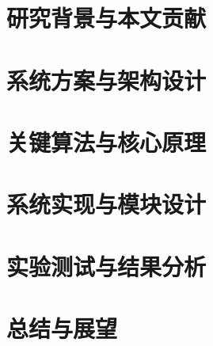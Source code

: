 \documentclass[12pt,a4paper,openany]{ctexrep}
\begin{document}
\chapter{研究背景与本文贡献}


\chapter{系统方案与架构设计}


\chapter{关键算法与核心原理}


\chapter{系统实现与模块设计}


\chapter{实验测试与结果分析}


\chapter{总结与展望}


\newpage
{}

\end{document}
